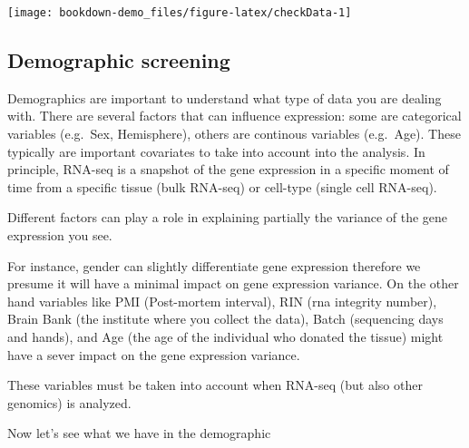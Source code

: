 \documentclass[]{book}
\newenvironment{Shaded}{\begin{snugshade}}{\end{snugshade}}
\newcommand{\CommentTok}[1]{\textcolor[rgb]{0.56,0.35,0.01}{\textit{#1}}}
\newcommand{\KeywordTok}[1]{\textcolor[rgb]{0.13,0.29,0.53}{\textbf{#1}}}
\newcommand{\NormalTok}[1]{#1}
\begin{document}
\begin{center}\texttt{[image: bookdown-demo\_files/figure-latex/checkData-1]} \end{center}

\hypertarget{demographic-screening}{%
\subsection{Demographic screening}\label{demographic-screening}}

Demographics are important to understand what type of data you are dealing with.
There are several factors that can influence expression: some are categorical variables (e.g.~Sex, Hemisphere), others are continous variables (e.g.~Age).
These typically are important covariates to take into account into the analysis.
In principle, RNA-seq is a snapshot of the gene expression in a specific moment of time from a specific tissue (bulk RNA-seq) or cell-type (single cell RNA-seq).

Different factors can play a role in explaining partially the variance of the gene expression you see.

For instance, gender can slightly differentiate gene expression therefore we presume it will have a minimal impact on gene expression variance. On the other hand variables like PMI (Post-mortem interval), RIN (rna integrity number), Brain Bank (the institute where you collect the data), Batch (sequencing days and hands), and Age (the age of the individual who donated the tissue) might have a sever impact on the gene expression variance.

These variables must be taken into account when RNA-seq (but also other genomics) is analyzed.

Now let's see what we have in the demographic

\begin{Shaded}
\end{Shaded}
\end{document}
